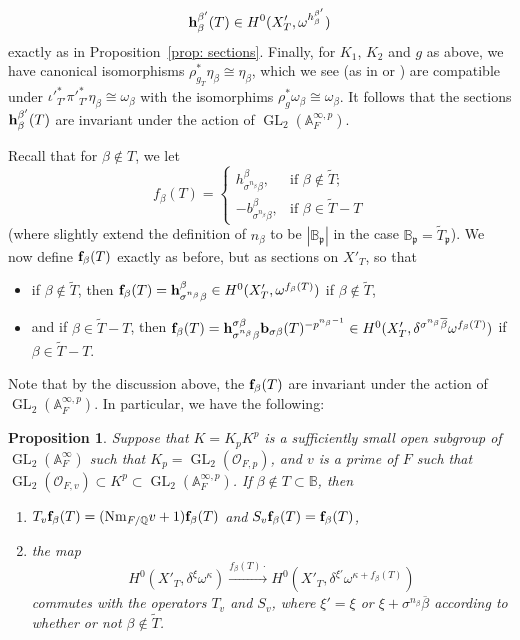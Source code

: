 \documentclass[11pt,pdflatex]{amsart}
\theoremstyle{plain}
\newtheorem{proposition}[theorem]{Proposition}
\theoremstyle{definition}
\newcommand{\lra}{\longrightarrow}
\newcommand{\QQ}{\mathbf{Q}}
\newcommand{\CO}{\mathcal{O}}
\newcommand{\gp}{\mathfrak{p}}
\theoremstyle{plain}
\theoremstyle{definition}
\theoremstyle{remark}
\numberwithin{equation}{section}
\numberwithin{figure}{section} \numberwithin{table}{subsection}
\newcommand{\GL}{{\operatorname{GL}}}
\def\AA{\mathbb{A}}
\def\BB{\mathbb{B}}
\def\QQ{\mathbb{Q}}
\begin{document}
$${\bf h}_{\beta}^{\beta'}(T) \in H^0(X_T',\omega^{h_\beta^{\beta'}})$$
exactly as in Proposition~\ref{prop: sections}.  Finally, for $K_1$, $K_2$ and $g$ as above, we have canonical isomorphisms $\rho_{g_T}^*\eta_\beta \cong \eta_\beta$, which we see (as in \cite[\S5.4]{DKS} or \cite[\S6.6]{M}) are compatible under $\iota'^*_{T'}\pi'^*_{T'}\eta_\beta \cong \omega_\beta$ with the isomorphims $\rho_g^*\omega_\beta \cong \omega_\beta$.  It follows that the sections ${\bf h}_{\beta}^{\beta'}(T)$ are invariant under the action of $\GL_2(\AA_F^{\infty,p})$.

Recall that for $\beta\not\in T$, we let 
$$f_\beta(T) = \left\{\begin{array}{rl}
h^{\beta}_{\sigma^{n_\beta}\beta},& \mbox{if $\beta\not\in \widetilde{T}$};\\
-b^{\beta}_{\sigma^{n_\beta}\beta},& \mbox{if $\beta\in \widetilde{T}-T$}\end{array}\right.$$
(where slightly extend the definition of $n_\beta$ to be $|\BB_\gp|$ in the case $\BB_\gp = \widetilde{T}_\gp$).
We now define ${\bf f}_\beta(T)$ exactly as before, but as sections on $X'_T$, so that
\begin{itemize}
\item if $\beta \not\in \widetilde{T}$, then ${\bf f}_\beta(T) ={\bf h}^\beta_{\sigma^{n_\beta}\beta} \in H^0(X'_T, \omega^{f_\beta(T)})$ if $\beta \not\in \widetilde{T}$, 
\item and if $\beta \in \widetilde{T}-T$, then ${\bf f}_\beta(T) ={\bf h}^{\sigma\beta}_{\sigma^{n_\beta}\beta}{\bf b}_{\sigma\beta}(T)^{-p^{n_\beta - 1}} \in H^0(X'_T, \delta^{\sigma^{n_\beta}\overline{\beta}}\omega^{f_\beta(T)})$ if $\beta \in \widetilde{T}-T$.
\end{itemize}
Note that by the discussion above, the ${\bf f}_\beta(T)$ are invariant under the action of $\GL_2(\AA_F^{\infty,p})$.  In particular, we have the following:
\begin{proposition} \label{prop: Hasse-like} Suppose that $K = K_pK^p$ is a sufficiently small open subgroup of $\GL_2(\AA_F^{\infty})$ such that $K_p = \GL_2(\CO_{F,p})$, and $v$  is a prime of $F$ such that $\GL_2(\CO_{F,v}) \subset K^p \subset \GL_2(\AA_F^{\infty,p})$.  If $\beta \not\in T \subset \BB$, then
\begin{enumerate}
\item $T_v{\bf f}_\beta(T) = ({\rm Nm}_{F/\QQ}v + 1) {\bf f}_\beta(T)$ and $S_v {\bf f}_\beta(T) = {\bf f}_\beta(T)$,
\item the map 
$$H^0(X'_T,\delta^\xi\omega^\kappa) \stackrel{f_\beta(T)\cdot}{\lra} H^0(X'_T,\delta^{\xi'}\omega^{\kappa+f_\beta(T)})$$
commutes with the operators $T_v$ and $S_v$,
where $\xi' = \xi$ or $\xi + \sigma^{n_\beta}\overline{\beta}$ according to whether or not $\beta\not\in\widetilde{T}$. 
\end{enumerate}
\end{proposition}
\end{document}
